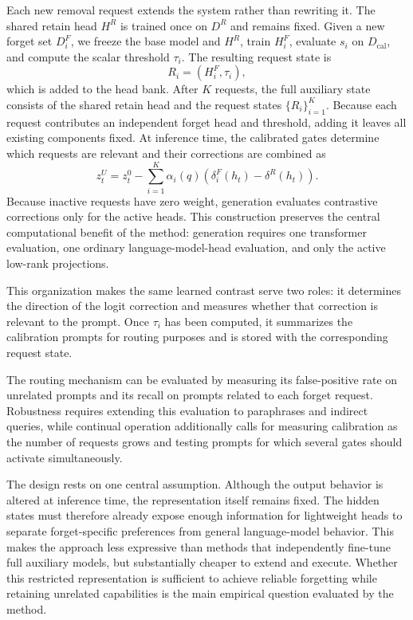 \documentclass[11pt]{article}
\begin{document}
Each new removal request extends the system rather than rewriting it. The shared retain head $H^R$ is trained once on $D^R$ and remains fixed. Given a new forget set $D_i^F$, we freeze the base model and $H^R$, train $H_i^F$, evaluate $s_i$ on $D_{\mathrm{cal}}$, and compute the scalar threshold $\tau_i$. The resulting request state is
\begin{equation}
    R_i=\left(H_i^F,\tau_i\right),
\end{equation}
which is added to the head bank. After $K$ requests, the full auxiliary state consists of the shared retain head and the request states $\{R_i\}_{i=1}^K$. Because each request contributes an independent forget head and threshold, adding it leaves all existing components fixed. At inference time, the calibrated gates determine which requests are relevant and their corrections are combined as
\begin{equation}
    z_t^U=z_t^0-\sum_{i=1}^{K}
    \alpha_i(q)
    \left(\delta_i^F(h_t)-\delta^R(h_t)\right).
\end{equation}
Because inactive requests have zero weight, generation evaluates contrastive corrections only for the active heads. This construction preserves the central computational benefit of the method: generation requires one transformer evaluation, one ordinary language-model-head evaluation, and only the active low-rank projections.

This organization makes the same learned contrast serve two roles: it determines the direction of the logit correction and measures whether that correction is relevant to the prompt. Once $\tau_i$ has been computed, it summarizes the calibration prompts for routing purposes and is stored with the corresponding request state.

The routing mechanism can be evaluated by measuring its false-positive rate on unrelated prompts and its recall on prompts related to each forget request. Robustness requires extending this evaluation to paraphrases and indirect queries, while continual operation additionally calls for measuring calibration as the number of requests grows and testing prompts for which several gates should activate simultaneously.

The design rests on one central assumption. Although the output behavior is altered at inference time, the representation itself remains fixed. The hidden states must therefore already expose enough information for lightweight heads to separate forget-specific preferences from general language-model behavior. This makes the approach less expressive than methods that independently fine-tune full auxiliary models, but substantially cheaper to extend and execute. Whether this restricted representation is sufficient to achieve reliable forgetting while retaining unrelated capabilities is the main empirical question evaluated by the method.
\end{document}

